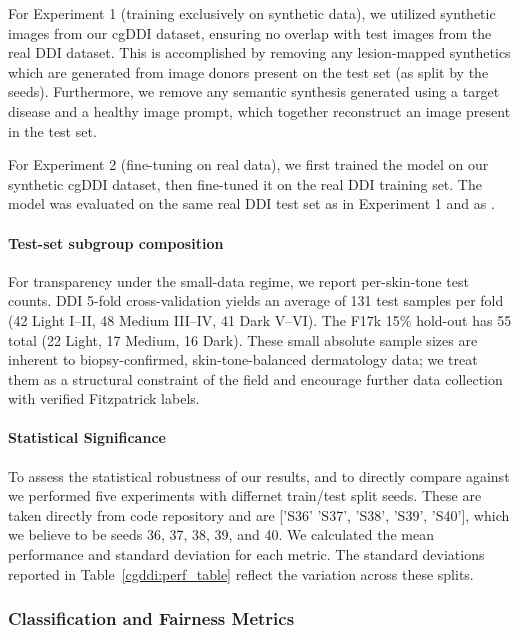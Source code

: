 \documentclass[11pt]{ucthesis}
\begin{document}
For Experiment 1 (training exclusively on synthetic data), we utilized synthetic images from our cgDDI dataset, ensuring no overlap with test images from the real DDI dataset. This is accomplished by removing any lesion-mapped synthetics which are generated from image donors present on the test set (as split by the \cite{aayushman-2024} seeds). Furthermore, we remove any semantic synthesis generated using a target disease and a healthy image prompt, which together reconstruct an image present in the test set.

For Experiment 2 (fine-tuning on real data), we first trained the model on our synthetic cgDDI dataset, then fine-tuned it on the real DDI training set. The model was evaluated on the same real DDI test set as in Experiment 1 and as \cite{aayushman-2024}.

\paragraph{Test-set subgroup composition}
For transparency under the small-data regime, we report per-skin-tone test counts. DDI 5-fold cross-validation yields an average of 131 test samples per fold (42 Light I--II, 48 Medium III--IV, 41 Dark V--VI). The F17k 15\% hold-out has 55 total (22 Light, 17 Medium, 16 Dark). These small absolute sample sizes are inherent to biopsy-confirmed, skin-tone-balanced dermatology data; we treat them as a structural constraint of the field and encourage further data collection with verified Fitzpatrick labels.

\paragraph{Statistical Significance}
To assess the statistical robustness of our results, and to directly compare against \cite{aayushman-2024} we performed five experiments with differnet train/test split seeds. These are taken directly from \cite{aayushman-2024} code repository and are ['S36' 'S37', 'S38', 'S39', 'S40'], which we believe to be seeds 36, 37, 38, 39, and 40. We calculated the mean performance and standard deviation for each metric. The standard deviations reported in Table~\ref{cgddi:perf_table} reflect the variation across these splits.

\subsubsection{Classification and Fairness Metrics}
\end{document}
